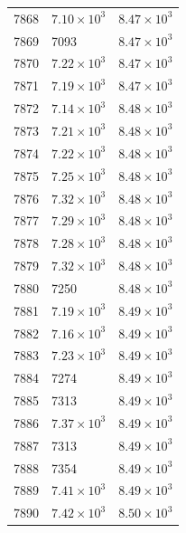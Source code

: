 \begin{table}[H]
\begin{tabular}{lll}
7868 & $\displaystyle 7.10 \times 10^{3}$ & $\displaystyle 8.47 \times 10^{3}$ \\
7869 & 7093 & $\displaystyle 8.47 \times 10^{3}$ \\
7870 & $\displaystyle 7.22 \times 10^{3}$ & $\displaystyle 8.47 \times 10^{3}$ \\
7871 & $\displaystyle 7.19 \times 10^{3}$ & $\displaystyle 8.47 \times 10^{3}$ \\
7872 & $\displaystyle 7.14 \times 10^{3}$ & $\displaystyle 8.48 \times 10^{3}$ \\
7873 & $\displaystyle 7.21 \times 10^{3}$ & $\displaystyle 8.48 \times 10^{3}$ \\
7874 & $\displaystyle 7.22 \times 10^{3}$ & $\displaystyle 8.48 \times 10^{3}$ \\
7875 & $\displaystyle 7.25 \times 10^{3}$ & $\displaystyle 8.48 \times 10^{3}$ \\
7876 & $\displaystyle 7.32 \times 10^{3}$ & $\displaystyle 8.48 \times 10^{3}$ \\
7877 & $\displaystyle 7.29 \times 10^{3}$ & $\displaystyle 8.48 \times 10^{3}$ \\
7878 & $\displaystyle 7.28 \times 10^{3}$ & $\displaystyle 8.48 \times 10^{3}$ \\
7879 & $\displaystyle 7.32 \times 10^{3}$ & $\displaystyle 8.48 \times 10^{3}$ \\
7880 & 7250 & $\displaystyle 8.48 \times 10^{3}$ \\
7881 & $\displaystyle 7.19 \times 10^{3}$ & $\displaystyle 8.49 \times 10^{3}$ \\
7882 & $\displaystyle 7.16 \times 10^{3}$ & $\displaystyle 8.49 \times 10^{3}$ \\
7883 & $\displaystyle 7.23 \times 10^{3}$ & $\displaystyle 8.49 \times 10^{3}$ \\
7884 & 7274 & $\displaystyle 8.49 \times 10^{3}$ \\
7885 & 7313 & $\displaystyle 8.49 \times 10^{3}$ \\
7886 & $\displaystyle 7.37 \times 10^{3}$ & $\displaystyle 8.49 \times 10^{3}$ \\
7887 & 7313 & $\displaystyle 8.49 \times 10^{3}$ \\
7888 & 7354 & $\displaystyle 8.49 \times 10^{3}$ \\
7889 & $\displaystyle 7.41 \times 10^{3}$ & $\displaystyle 8.49 \times 10^{3}$ \\
7890 & $\displaystyle 7.42 \times 10^{3}$ & $\displaystyle 8.50 \times 10^{3}$ \\

\end{tabular}
\end{table}
